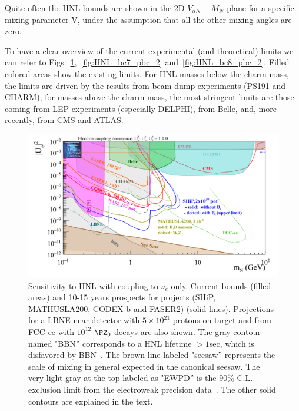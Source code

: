 Quite often the HNL bounds are shown in the 2D $V_{\alpha N} -
M_N$ plane for a specific mixing parameter V, under the assumption that all the other mixing angles are zero. 

To have a clear overview of the current experimental (and theoretical)
limits we can refer to
Figs.~\ref{fig:HNL_bc6_pbc_2},~\ref{fig:HNL_bc7_pbc_2}
and~\ref{fig:HNL_bc8_pbc_2}. Filled colored areas show the existing limits. For HNL masses below the charm mass, the limits are driven by the results from beam-dump experiments (PS191 and CHARM); for masses above
the charm mass, the most stringent limits are those coming from LEP experiments
(especially DELPHI), from Belle, and, more recently, from CMS and ATLAS.



\begin{figure}[h]
  \centering
  \includegraphics[width=.90\textwidth]{Figures/c3/HNL_bc6_pbc_2.png}
    \caption{Sensitivity to HNL with coupling to $\nu_e$ only. Current bounds (filled areas) and 10-15 years prospects for projects
(SHiP, MATHUSLA200, CODEX-b and FASER2) (solid lines). Projections for a LBNE
near detector with $5\times 10^{21}$ protons-on-target and from FCC-ee with
$10^{12}$ $\PZ_0$ decays are also shown.
The gray contour named "BBN'' corresponds to a HNL lifetime $>1$sec,
which is disfavored by BBN~\cite{Ruchayskiy_2012}. The brown line
labeled "seesaw'' represents the scale of mixing in general expected
in the canonical seesaw. The very light gray at the top
labeled as "EWPD'' is the 90\% C.L. exclusion limit from the
electroweak precision data~\cite{Antusch_2015}. The other solid
contours are explained in the text. 
}
  \label{fig:HNL_bc6_pbc_2}
\end{figure}

